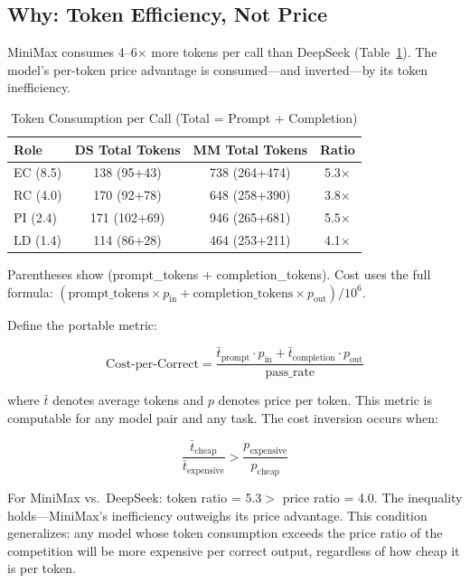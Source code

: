 \documentclass[11pt,a4paper]{article}
\begin{document}
\subsection{Why: Token Efficiency, Not Price}

MiniMax consumes 4--6$\times$ more tokens per call than DeepSeek (Table~\ref{tab:token_efficiency}). The model's per-token price advantage is consumed---and inverted---by its token inefficiency.

\begin{table}[htbp]\centering\caption{Token Consumption per Call (Total = Prompt + Completion)}\label{tab:token_efficiency}\small
\begin{tabular}{lccc}\toprule\textbf{Role} & \textbf{DS Total Tokens} & \textbf{MM Total Tokens} & \textbf{Ratio}\\\midrule
EC (8.5) & 138 (95+43) & 738 (264+474) & 5.3$\times$\\
RC (4.0) & 170 (92+78) & 648 (258+390) & 3.8$\times$\\
PI (2.4) & 171 (102+69) & 946 (265+681) & 5.5$\times$\\
LD (1.4) & 114 (86+28) & 464 (253+211) & 4.1$\times$\\\bottomrule
\end{tabular}

\vspace{2pt}
{\footnotesize Parentheses show (prompt\_tokens + completion\_tokens). Cost uses the full formula: $(\text{prompt\_tokens}\times p_{\text{in}} + \text{completion\_tokens}\times p_{\text{out}})/10^6$.}
\end{table}

Define the portable metric:

\[\text{Cost-per-Correct} = \frac{\bar{t}_{\text{prompt}} \cdot p_{\text{in}} + \bar{t}_{\text{completion}} \cdot p_{\text{out}}}{\text{pass\_rate}}\]

where $\bar{t}$ denotes average tokens and $p$ denotes price per token. This metric is computable for any model pair and any task. The cost inversion occurs when:

\[\frac{\bar{t}_{\text{cheap}}}{\bar{t}_{\text{expensive}}} > \frac{p_{\text{expensive}}}{p_{\text{cheap}}}\]

For MiniMax vs.\ DeepSeek: token ratio = 5.3$ > $ price ratio = 4.0. The inequality holds---MiniMax's inefficiency outweighs its price advantage. This condition generalizes: any model whose token consumption exceeds the price ratio of the competition will be more expensive per correct output, regardless of how cheap it is per token.
\end{document}
